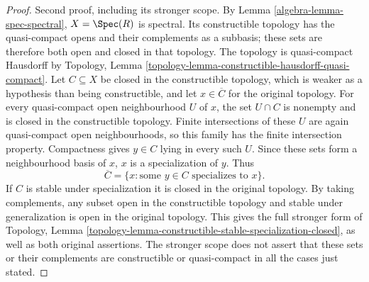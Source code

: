 \begin{proof}
\medskip\noindent
Second proof, including its stronger scope. By
Lemma \ref{algebra-lemma-spec-spectral}, $X=\Spec(R)$ is
spectral. Its constructible topology has the
quasi-compact opens and their complements as a
subbasis; these sets are therefore both open and
closed in that topology. The topology is
quasi-compact Hausdorff by Topology, Lemma
\ref{topology-lemma-constructible-hausdorff-quasi-compact}.
Let $C\subseteq X$ be closed in the constructible
topology, which is weaker as a hypothesis than
being constructible, and let $x\in\overline C$
for the original topology. For every quasi-compact
open neighbourhood $U$ of $x$, the set $U\cap C$
is nonempty and is closed in the constructible
topology. Finite intersections of these $U$ are
again quasi-compact open neighbourhoods, so this
family has the finite intersection property.
Compactness gives $y\in C$ lying in every such $U$.
Since these sets form a neighbourhood basis of $x$,
$x$ is a specialization of $y$. Thus
$$
\overline C=\{x:\text{some }y\in C\text{ specializes to }x\}.
$$
If $C$ is stable under specialization it is closed
in the original topology. By taking complements,
any subset open in the constructible topology
and stable under generalization is open in the
original topology. This gives the full stronger
form of Topology, Lemma
\ref{topology-lemma-constructible-stable-specialization-closed},
as well as both original assertions. The stronger
scope does not assert that these sets or their
complements are constructible or quasi-compact in
all the cases just stated.
\end{proof}
